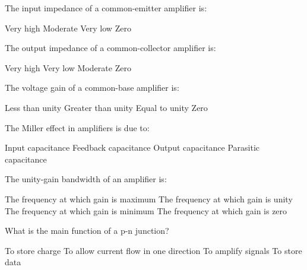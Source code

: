 \begin{question}[2]
The input impedance of a common-emitter amplifier is:

\begin{oneparcheckboxes}
\choice Very high
\correctchoice Moderate
\choice Very low
\choice Zero
\end{oneparcheckboxes}
\end{question}

\begin{question}[2]
The output impedance of a common-collector amplifier is:

\begin{oneparcheckboxes}
\choice Very high
\correctchoice Very low
\choice Moderate
\choice Zero
\end{oneparcheckboxes}
\end{question}

\begin{question}[2]
The voltage gain of a common-base amplifier is:

\begin{oneparcheckboxes}
\choice Less than unity
\correctchoice Greater than unity
\choice Equal to unity
\choice Zero
\end{oneparcheckboxes}
\end{question}

\begin{question}[2]
The Miller effect in amplifiers is due to:

\begin{oneparcheckboxes}
\choice Input capacitance
\correctchoice Feedback capacitance
\choice Output capacitance
\choice Parasitic capacitance
\end{oneparcheckboxes}
\end{question}

\begin{question}[2]
The unity-gain bandwidth of an amplifier is:

\begin{oneparcheckboxes}
\choice The frequency at which gain is maximum
\correctchoice The frequency at which gain is unity
\choice The frequency at which gain is minimum
\choice The frequency at which gain is zero
\end{oneparcheckboxes}
\end{question}

\begin{question}[2]
What is the main function of a p-n junction?
\begin{oneparcheckboxes}
\choice To store charge
\correctchoice To allow current flow in one direction
\choice To amplify signals
\choice To store data
\end{oneparcheckboxes}
\end{question}

